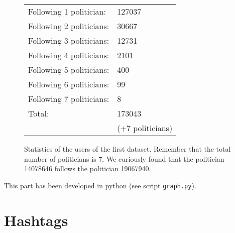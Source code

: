 \documentclass[a4paper,11pt,oneside]{article}
\begin{document}
\begin{figure}[h]
\begin{center}
	\begin{tabular}{l | l}
	Following 1 politician: & 127037\\ %
	Following 2 politicians: & 30667\\ %
	Following 3 politicians: & 12731\\ %
	Following 4 politicians: & 2101\\ %
	Following 5 politicians: & 400\\ %
	Following 6 politicians: & 99\\ %
	Following 7 politicians: & 8\\ \hline
	Total:	 & 173043 \\
	& (+7 politicians)\\ %
	\end{tabular}
\end{center}
\caption{Statistics of the users of the first dataset. Remember that the total number of politicians is 7. We curiously found that the politician 14078646 follows the politician 19067940.}
\end{figure}

This part has been developed in python (see script \texttt{graph.py}).

\section{Hashtags}
\end{document}

